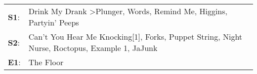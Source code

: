 \begin{supertabular}{p{0.03\textwidth}p{0.92\textwidth}}
 \textbf{S1}:  &                                            Drink My Drank\textsuperscript{} \textgreater \enspace Plunger\textsuperscript{}, \enspace Words\textsuperscript{}, \enspace Remind Me\textsuperscript{}, \enspace Higgins\textsuperscript{}, \enspace Partyin' Peeps\textsuperscript{}  \enspace  \\
 \textbf{S2}:  &  Can't You Hear Me Knocking[1]\textsuperscript{}, \enspace Forks\textsuperscript{}, \enspace Puppet String\textsuperscript{}, \enspace Night Nurse\textsuperscript{}, \enspace Roctopus\textsuperscript{}, \enspace Example 1\textsuperscript{}, \enspace JaJunk\textsuperscript{}  \enspace  \\
 \textbf{E1}:  &                                                                                                                                                                                                                                                        The Floor\textsuperscript{}  \enspace  \\
\end{supertabular}

